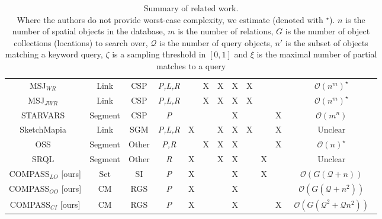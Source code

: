 {\begin{table*}[h!]
\begin{center}
\begin{tabular}{|c|ccc|cccc|ccc|c|}
            MSJ$_{WR}$~\cite{Papadias1998}                      & Link & CSP         & \textit{P,L,R} &   & X & X & X & X &   &   & $\mathcal{O}(n^m)^{\star}$ \\ %
            MSJ$_{JWR}$~\cite{Papadias1998}                     & Link & CSP         & \textit{P,L,R} &   & X & X & X & X &   &   & $\mathcal{O}(n^m)^{\star}$ \\ %
            STARVARS~\cite{Lee2013}                             &Segment & CSP         & \textit{P}     &   &   &   & X &   &   & X & $\mathcal{O}(m^n)$ \\
            SketchMapia~\cite{Schwering2014,Jan2015}            & Link   & SGM   & \textit{P,L,R} & X &   & X & X & X &   & X & Unclear \\         %
            OSS~\cite{Liu2003}                                  &Segment & Other & \textit{P,R}   &   & X & X & X &   &   & X & $\mathcal{O}(n)^{\star}$ \\ %
            SRQL~\cite{Dellapenna2012,Dellapenna2017}           &Segment & Other & \textit{R}     & X &   & X & X &   & X &   & Unclear \\
            COMPASS$_{LO}$ [ours]                               & Set    &  SI  & \textit{P}     & X &   &   & X &   & X &   & $\mathcal{O}(G(\mathcal{Q} + n))$ \\    
            COMPASS$_{OO}$ [ours]                               & CM     &  RGS  & \textit{P}     & X &   &   & X &   &   &   & $\mathcal{O}(G(\mathcal{Q} + n^2))$ \\  
            COMPASS$_{CI}$ [ours]                               & CM     &  RGS  & \textit{P}     & X &   &   & X &   &   & X & ~$\mathcal{O}(G(\mathcal{Q}^2 + \mathcal{Q} n^2))$~ \\
            
            
            
            \hline     
        \end{tabular}
        \caption{Summary of related work. \\ \textnormal{Where the authors do not provide worst-case complexity, we estimate (denoted with $^{\star}$). $n$ is the number of spatial objects in the database, $m$ is the number of relations, $G$ is the number of object collections (locations) to search over, $\mathcal{Q}$ is the number of query objects, $n'$ is the subset of objects matching a keyword  query, $\zeta$ is a sampling threshold in $[0,1]$ and $\xi$ is the maximal number of partial matches to a query}} 
        \label{Table:related_work}
    \end{center}
\end{table*}
}
\normalsize











